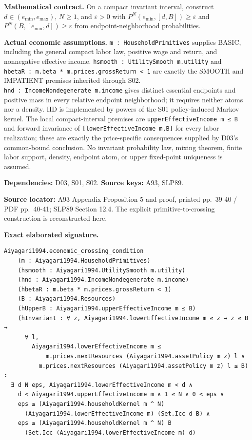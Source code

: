 \documentclass[
  11pt,
]{article}
\let\LedgerOriginalTexttt\texttt
\renewcommand{\texttt}[1]{{\small\LedgerOriginalTexttt{#1}}}
\begin{document}
\textbf{Mathematical contract.} On a compact invariant interval,
construct \(d\in(e_{\min},e_{\max})\), \(N\geq1\), and \(\varepsilon>0\)
with \(P^N(e_{\min},[d,B])\geq\varepsilon\) and
\(P^N(B,[e_{\min},d])\geq\varepsilon\) from endpoint-neighborhood
probabilities.

\textbf{Actual economic assumptions.} \texttt{m\ :\ HouseholdPrimitives}
supplies BASIC, including the general compact labor law, positive wage
and return, and nonnegative effective income.
\texttt{hsmooth\ :\ UtilitySmooth\ m.utility} and
\texttt{hbetaR\ :\ m.beta\ *\ m.prices.grossReturn\ \textless{}\ 1} are
exactly the SMOOTH and IMPATIENT premises inherited through S02.
\texttt{hnd\ :\ IncomeNondegenerate\ m.income} gives distinct essential
endpoints and positive mass in every relative endpoint neighborhood; it
requires neither atoms nor a density. IID is implemented by powers of
the S01 policy-induced Markov kernel. The local compact-interval
premises are \texttt{upperEffectiveIncome\ m\ ≤\ B} and forward
invariance of \texttt{{[}lowerEffectiveIncome\ m,B{]}} for every labor
realization; these are exactly the price-specific consequences supplied
by D03's common-bound conclusion. No invariant probability law, mixing
theorem, finite labor support, density, endpoint atom, or upper
fixed-point uniqueness is assumed.

\textbf{Dependencies:} D03, S01, S02. \textbf{Source keys:} A93, SLP89.

\textbf{Source locator:} A93 Appendix Proposition 5 and proof, printed
pp.~39-40 / PDF pp.~40-41; SLP89 Section 12.4. The explicit
primitive-to-crossing construction is reconstructed here.

\textbf{Exact elaborated signature.}

\begin{verbatim}
Aiyagari1994.economic_crossing_condition
    (m : Aiyagari1994.HouseholdPrimitives)
    (hsmooth : Aiyagari1994.UtilitySmooth m.utility)
    (hnd : Aiyagari1994.IncomeNondegenerate m.income)
    (hbetaR : m.beta * m.prices.grossReturn < 1)
    (B : Aiyagari1994.Resources)
    (hUpperB : Aiyagari1994.upperEffectiveIncome m ≤ B)
    (hInvariant : ∀ z, Aiyagari1994.lowerEffectiveIncome m ≤ z → z ≤ B →
      ∀ l,
        Aiyagari1994.lowerEffectiveIncome m ≤
            m.prices.nextResources (Aiyagari1994.assetPolicy m z) l ∧
          m.prices.nextResources (Aiyagari1994.assetPolicy m z) l ≤ B) :
  ∃ d N eps, Aiyagari1994.lowerEffectiveIncome m < d ∧
    d < Aiyagari1994.upperEffectiveIncome m ∧ 1 ≤ N ∧ 0 < eps ∧
    eps ≤ (Aiyagari1994.householdKernel m ^ N)
      (Aiyagari1994.lowerEffectiveIncome m) (Set.Icc d B) ∧
    eps ≤ (Aiyagari1994.householdKernel m ^ N) B
      (Set.Icc (Aiyagari1994.lowerEffectiveIncome m) d)
\end{verbatim}
\end{document}
